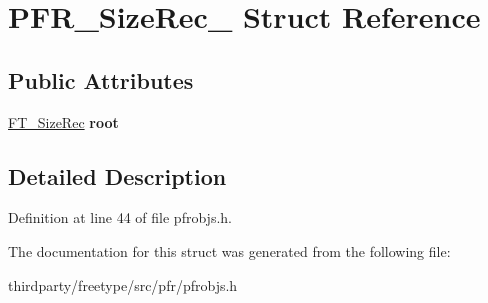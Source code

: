 \hypertarget{struct_p_f_r___size_rec__}{}\section{P\+F\+R\+\_\+\+Size\+Rec\+\_\+ Struct Reference}
\label{struct_p_f_r___size_rec__}
\subsection*{Public Attributes}
\begin{DoxyCompactItemize}
\item 
\mbox{\label{struct_p_f_r___size_rec___a625cb7bbd1515325c4114ec8f82c5ffe}} 
\hyperlink{struct_f_t___size_rec__}{F\+T\+\_\+\+Size\+Rec} {\bfseries root}
\end{DoxyCompactItemize}


\subsection{Detailed Description}


Definition at line 44 of file pfrobjs.\+h.



The documentation for this struct was generated from the following file\+:\begin{DoxyCompactItemize}
\item 
thirdparty/freetype/src/pfr/pfrobjs.\+h\end{DoxyCompactItemize}
